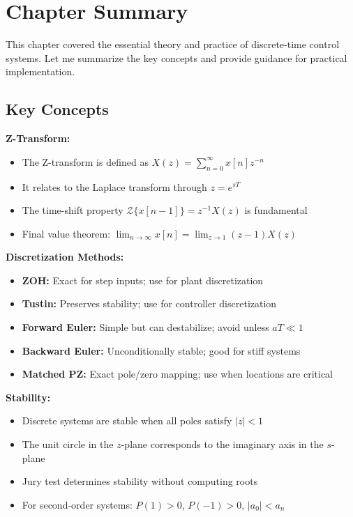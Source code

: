 \section{Chapter Summary}
\label{sec:discrete_summary}

This chapter covered the essential theory and practice of discrete-time control systems. Let me summarize the key concepts and provide guidance for practical implementation.

\subsection{Key Concepts}

\textbf{Z-Transform:}
\begin{itemize}
    \item The Z-transform is defined as $X(z) = \sum_{n=0}^{\infty} x[n] z^{-n}$
    \item It relates to the Laplace transform through $z = e^{sT}$
    \item The time-shift property $\mathcal{Z}\{x[n-1]\} = z^{-1}X(z)$ is fundamental
    \item Final value theorem: $\lim_{n\to\infty} x[n] = \lim_{z\to 1}(z-1)X(z)$
\end{itemize}

\textbf{Discretization Methods:}
\begin{itemize}
    \item \textbf{ZOH:} Exact for step inputs; use for plant discretization
    \item \textbf{Tustin:} Preserves stability; use for controller discretization
    \item \textbf{Forward Euler:} Simple but can destabilize; avoid unless $aT \ll 1$
    \item \textbf{Backward Euler:} Unconditionally stable; good for stiff systems
    \item \textbf{Matched PZ:} Exact pole/zero mapping; use when locations are critical
\end{itemize}

\textbf{Stability:}
\begin{itemize}
    \item Discrete systems are stable when all poles satisfy $|z| < 1$
    \item The unit circle in the $z$-plane corresponds to the imaginary axis in the $s$-plane
    \item Jury test determines stability without computing roots
    \item For second-order systems: $P(1) > 0$, $P(-1) > 0$, $|a_0| < a_n$
\end{itemize}

